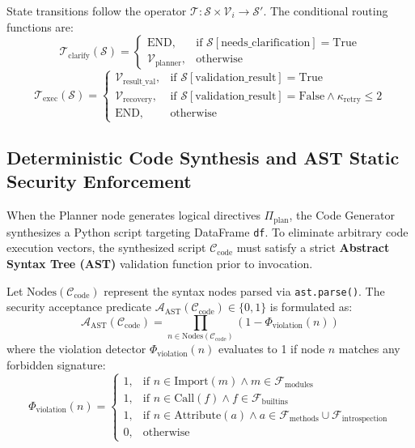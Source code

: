 \documentclass[conference]{IEEEtran}
\begin{document}
State transitions follow the operator $\mathcal{T}: \mathcal{S} \times \mathcal{V}_i \to \mathcal{S}'$. The conditional routing functions are:
\begin{equation}
\mathcal{T}_{\text{clarify}}(\mathcal{S}) = \begin{cases} 
\text{END}, & \text{if } \mathcal{S}[\text{needs\_clarification}] = \text{True} \\ 
\mathcal{V}_{\text{planner}}, & \text{otherwise} 
\end{cases}
\end{equation}
\begin{equation}
\mathcal{T}_{\text{exec}}(\mathcal{S}) = \begin{cases} 
\mathcal{V}_{\text{result\_val}}, & \text{if } \mathcal{S}[\text{validation\_result}] = \text{True} \\ 
\mathcal{V}_{\text{recovery}}, & \text{if } \mathcal{S}[\text{validation\_result}] = \text{False} \land \kappa_{\text{retry}} \le 2 \\ 
\text{END}, & \text{otherwise} 
\end{cases}
\end{equation}

\subsection{Deterministic Code Synthesis and AST Static Security Enforcement}
When the Planner node generates logical directives $\Pi_{\text{plan}}$, the Code Generator synthesizes a Python script targeting DataFrame \texttt{df}. To eliminate arbitrary code execution vectors, the synthesized script $\mathcal{C}_{\text{code}}$ must satisfy a strict \textbf{Abstract Syntax Tree (AST)} validation function prior to invocation.

Let $\text{Nodes}(\mathcal{C}_{\text{code}})$ represent the syntax nodes parsed via \texttt{ast.parse()}. The security acceptance predicate $\mathcal{A}_{\text{AST}}(\mathcal{C}_{\text{code}}) \in \{0, 1\}$ is formulated as:
\begin{equation}
\mathcal{A}_{\text{AST}}(\mathcal{C}_{\text{code}}) = \prod_{n \in \text{Nodes}(\mathcal{C}_{\text{code}})} \left( 1 - \Phi_{\text{violation}}(n) \right)
\end{equation}
where the violation detector $\Phi_{\text{violation}}(n)$ evaluates to 1 if node $n$ matches any forbidden signature:
\begin{equation}
\Phi_{\text{violation}}(n) = \begin{cases}
1, & \text{if } n \in \text{Import}(m) \land m \in \mathcal{F}_{\text{modules}} \\
1, & \text{if } n \in \text{Call}(f) \land f \in \mathcal{F}_{\text{builtins}} \\
1, & \text{if } n \in \text{Attribute}(a) \land a \in \mathcal{F}_{\text{methods}} \cup \mathcal{F}_{\text{introspection}} \\
0, & \text{otherwise}
\end{cases}
\end{equation}
\end{document}
